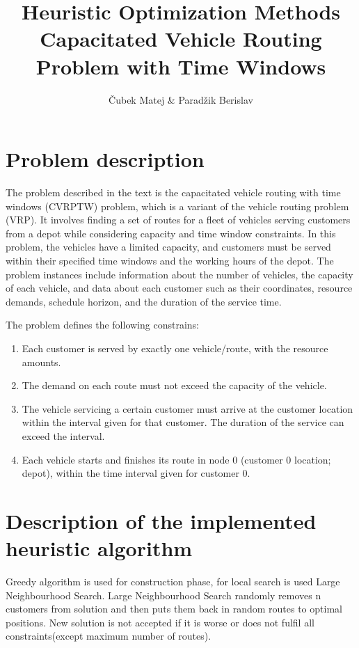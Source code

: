 \documentclass{article}
\title{Heuristic Optimization Methods
\\ Capacitated Vehicle Routing Problem with Time Windows}
\author{Čubek Matej & Paradžik Berislav}
\begin{document}
\maketitle
\clearpage

\tableofcontents

\clearpage

\section{Problem description}
The problem described in the text is the capacitated vehicle routing with time windows (CVRPTW) problem, which is a variant of the vehicle routing problem (VRP). It involves finding a set of routes for a fleet of vehicles serving customers from a depot while considering capacity and time window constraints. In this problem, the vehicles have a limited capacity, and customers must be served within their specified time windows and the working hours of the depot. The problem instances include information about the number of vehicles, the capacity of each vehicle, and data about each customer such as their coordinates, resource demands, schedule horizon, and the duration of the service time.

The problem defines the following constrains:
\begin{enumerate}
  \item Each customer is served by exactly one vehicle/route, with the resource amounts.
  \item The demand on each route must not exceed the capacity of the vehicle.
  \item The vehicle servicing a certain customer must arrive at the customer location
within the interval given for that customer. The duration of the service can
exceed the interval.
\item Each vehicle starts and finishes its route in node 0 (customer 0 location; depot),
within the time interval given for customer 0.
\end{enumerate}


\section{Description of the implemented heuristic algorithm}
Greedy algorithm is used for construction phase, for local search is used Large Neighbourhood Search. Large Neighbourhood Search randomly removes n customers from solution and then puts them back in random routes to optimal positions. New solution is not accepted if it is worse or does not fulfil all constraints(except maximum number of routes).
\end{document}
